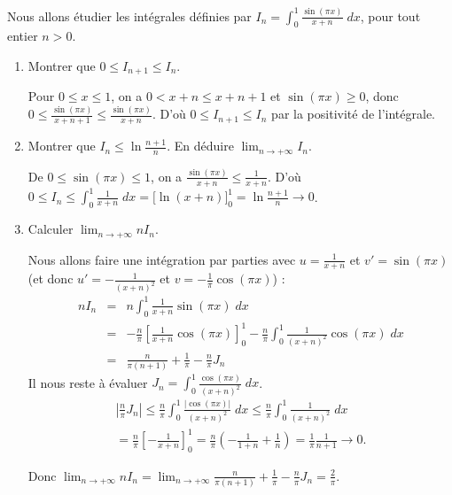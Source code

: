 \documentclass[class=report,crop=false]{standalone}
\begin{document}
\begin{exemple}
Nous allons étudier les intégrales définies par
$I_n=\displaystyle \int_0^1 \frac{\sin(\pi x)}{x+n} \;dx$, pour tout entier $n>0$.
\begin{enumerate}
\item Montrer que $0\le I_{n+1}\le I_n$.

Pour $0\le x\le 1$, on a $0<x+n\le x+n+1$ et $\sin(\pi x)\ge 0$,
donc $0\le \frac{\sin(\pi x)}{x+n+1}\le \frac{\sin(\pi x)}{x+n}$.
D'où $0\le I_{n+1}\le I_n$ par la positivité de l'intégrale.

\item Montrer que $I_n \le \ln\frac{n+1}{n}$. En déduire $\lim_{n\to+\infty}I_n$.

De $0\le \sin(\pi x)\le 1$, on a $\frac{\sin(\pi x)}{x+n}\le
\frac{1}{x+n}$. D'où
$0 \le I_n\le \int_0^1 \frac{1}{x+n} \; dx=\big[\ln(x+n)\big]_0^1=\ln\frac{n+1}{n}\to 0$.

\item Calculer $\lim_{n\to+\infty} n I_n$.

Nous allons faire une intégration par parties avec $u=\frac{1}{x+n}$ et $v'=\sin(\pi x)$
(et donc $u' = - \frac{1}{(x+n)^2}$ et $v = - \frac 1\pi \cos(\pi x)$) :
\begin{eqnarray*}
n I_n 
  &=& n\int_0^1\frac1{x+n} \sin(\pi x) \; dx \\
  &=& - \frac n\pi\left[\frac{1}{x+n} \cos(\pi x)\right]_0^1
      - \frac n\pi \int_0^1 \frac{1}{(x+n)^2}\cos(\pi x) \; dx \\
  &=& \frac{n}{\pi(n+1)}+\frac{1}{\pi} - \frac{n}{\pi}J_n
\end{eqnarray*}
Il nous reste à évaluer $J_n = \int_0^1 \frac{\cos(\pi x)}{(x+n)^2} \; dx$.
\begin{multline*}
\left|\frac{n}{\pi}J_n\right| \le \frac{n}{\pi}\int_0^1 \frac{|\cos(\pi x)|}{(x+n)^2} \; dx
\le\frac{n}{\pi}\int_0^1\frac{1}{(x+n)^2} \; dx \\
=\frac{n}{\pi}\left[-\frac{1}{x+n}\right]_0^1
=\frac{n}{\pi}\left(-\frac{1}{1+n}+\frac{1}{n}\right) =\frac{1}{\pi}\frac{1}{n+1} \to0.
\end{multline*}

Donc $\lim_{n\to+\infty} n I_n =\lim_{n\to+\infty} \frac{n}{\pi(n+1)}+\frac{1}{\pi} - \frac{n}{\pi}J_n =\frac{2}{\pi}.$
\end{enumerate}
\end{exemple}


\end{document}
